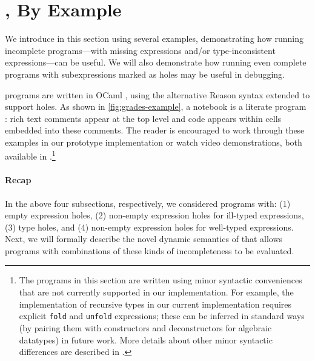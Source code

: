 \newcommand{\examplesSec}{\HazelnutLive, By Example}
\section{\protect\examplesSec} %
\label{sec:examples}

\newcommand{\overviewExample}[2]{\paragraph{Example {#1}: {#2}}}

We introduce \HazelnutLive{} in this section using several examples,
demonstrating how running incomplete programs---with missing expressions and/or
type-inconsistent expressions---can be useful.
%
We will also demonstrate how running even complete programs with subexpressions
marked as holes may be useful in debugging.

\HazelnutLive{} programs are written in OCaml \cite{leroy03:_ocaml}, using the
alternative Reason syntax \cite{reason-what} extended to support holes.
%
As shown in \autoref{fig:grades-example}, a \HazelnutLive{} notebook is a
literate program \cite{knuth1984literate}: rich text comments appear at the top
level and code appears within cells embedded into these comments.
%
The reader is encouraged to work through these examples in our prototype
implementation or watch video demonstrations, both available in
\suppMaterials{}.\footnote{
%
The programs in this section are written using minor syntactic conveniences that
are not currently supported in our implementation.
%
For example, the implementation of recursive types in our current implementation
requires explicit \texttt{fold} and \texttt{unfold} expressions; these can be
inferred in standard ways (by pairing them with constructors and deconstructors
for algebraic datatypes) in future work.
%
More details about other minor syntactic differences are described in
\suppMaterials{}.
%
}







\paragraph{Recap}
%
In the above four subsections, respectively, we considered programs with:
%
(1) empty expression holes,
%
(2) non-empty expression holes for ill-typed expressions,
%
(3) type holes, and
%
(4) non-empty expression holes for well-typed expressions.
%
Next, we will formally describe the novel dynamic semantics of \HazelnutLive{}
that allows programs with combinations of these kinds of incompleteness to be
evaluated.
